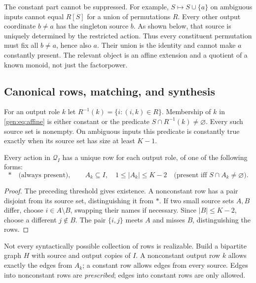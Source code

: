 The constant part cannot be suppressed. For example,
$S\mapsto S\cup\{a\}$ on ambiguous inputs cannot equal $R[S]$ for a
union of permutations $R$. Every other output coordinate $b\ne a$ has
the singleton source $b$. As shown below, that source is uniquely
determined by the restricted action. Thus every constituent permutation
must fix all $b\ne a$, hence also $a$. Their union is the identity and
cannot make $a$ constantly present. The relevant object is an affine
extension and a quotient of a known monoid, not just the factorpower.

\subsection{Canonical rows, matching, and synthesis}

For an output role $k$ let
$R^{-1}(k)=\{i:(i,k)\in R\}$. Membership of $k$ in
\eqref{gen:eq:affine} is either constant or the predicate
$S\cap R^{-1}(k)\ne\varnothing$. Every such source set is nonempty.
On ambiguous inputs this predicate is constantly true exactly when its
source set has size at least $K-1$.

\begin{lemma}\label{gen:lem:rows}
Every action in $\mathcal Q_I$ has a unique row for each output role,
of one of the following forms:
\[
 *\quad\text{(always present)},\qquad
 A_k\subseteq I,\quad 1\leq|A_k|\leq K-2
 \quad\text{(present iff }S\cap A_k\ne\varnothing\text{)}.
\]
\end{lemma}
\begin{proof}
The preceding threshold gives existence. A nonconstant row has a pair
disjoint from its source set, distinguishing it from $*$. If two small
source sets $A,B$ differ, choose $i\in A\setminus B$, swapping their
names if necessary. Since $|B|\leq K-2$, choose a different
$j\notin B$. The pair $\{i,j\}$ meets $A$ and misses $B$, distinguishing
the rows.
\end{proof}

Not every syntactically possible collection of rows is realizable. Build
a bipartite graph $H$ with source and output copies of $I$. A nonconstant
output row $k$ allows exactly the edges from $A_k$; a constant row allows
edges from every source. Edges into nonconstant rows are
\emph{prescribed}; edges into constant rows are only allowed.

